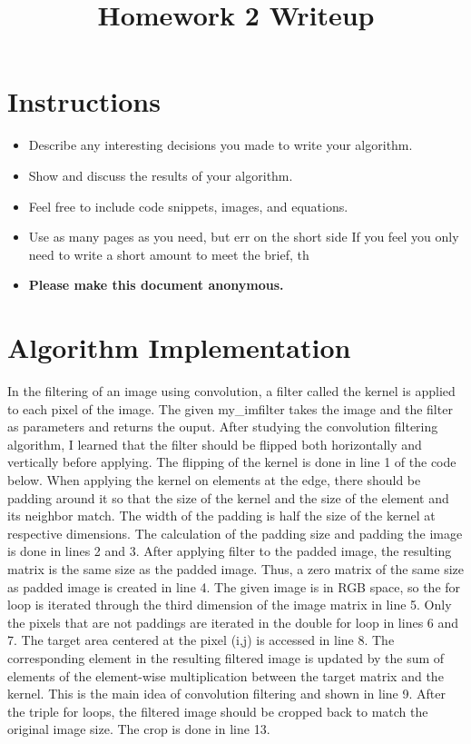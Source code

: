 \title{\vspace{-1cm}Homework 2 Writeup}



\maketitle
\vspace{-3cm}
\thispagestyle{fancy}

\section*{Instructions}
\begin{itemize}
  \item Describe any interesting decisions you made to write your algorithm.
  \item Show and discuss the results of your algorithm.
  \item Feel free to include code snippets, images, and equations.
  \item Use as many pages as you need, but err on the short side If you feel you only need to write a short amount to meet the brief, th
  
  \item \textbf{Please make this document anonymous.}
\end{itemize}

\section*{Algorithm Implementation}

In the filtering of an image using convolution, a filter called the kernel is applied to each pixel of the image. The given my\_imfilter takes the image and the filter as parameters and returns the ouput. 
After studying the convolution filtering algorithm, I learned that the filter should be flipped both horizontally and vertically before applying. The flipping of the kernel is done in line 1 of the code below. 
When applying the kernel on elements at the edge, there should be padding around it so that the size of the kernel and the size of the element and its neighbor match. The width of the padding is half the size of the kernel at respective dimensions. The calculation of the padding size and padding the image is done in lines 2 and 3. 
After applying filter to the padded image, the resulting matrix is the same size as the padded image. Thus, a zero matrix of the same size as padded image is created in line 4.
The given image is in RGB space, so the for loop is iterated through the third dimension of the image matrix in line 5.
Only the pixels that are not paddings are iterated in the double for loop in lines 6 and 7. 
The target area centered at the pixel (i,j) is accessed in line 8.
The corresponding element in the resulting filtered image is updated by the sum of elements of the element-wise multiplication between the target matrix and the kernel. This is the main idea of convolution filtering and shown in line 9.
After the triple for loops, the filtered image should be cropped back to match the original image size. The crop is done in line 13.

